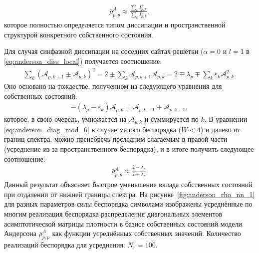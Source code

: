 \begin{equation}
	\label{eq:anderson_diag_mod_5}
	\begin{gathered}
		\bar{\rho}^A_{p,p} \approx \frac{\sum_k I^{+}_{p,k}}{ \sum_k I^{-}_{p,k}}, 
	\end{gathered}
\end{equation}
которое полностью определяется типом диссипации и пространственной структурой конкретного собственного состояния.

Для случая синфазной диссипации на соседних сайтах решётки (\(\alpha=0\) и \(l=1\) в \cref{eq:anderson_diss_local}) получается соотношение:
\begin{equation}
	\label{eq:anderson_diag_mod_6}
	\begin{gathered}
		\sum_k \left( \mathcal{A}_{p, k+1} \pm \mathcal{A}_{p, k} \right)^2 = 2 \pm \sum_k \mathcal{A}_{p, k+1} \mathcal{A}_{p, k} = 2 \mp \lambda_p \mp \sum_k \varepsilon_k \mathcal{A}^2_{p, k}.
	\end{gathered}
\end{equation}
Оно основано на тождестве, полученном из следующего уравнения для собственных состояний:
\begin{equation}
	\label{eq:anderson_diag_mod_7}
	\begin{gathered}
		-\left( \lambda_p - \varepsilon_k \right) \mathcal{A}_{p, k} = \mathcal{A}_{p, k-1} + \mathcal{A}_{p, k+1},
	\end{gathered}
\end{equation}
которое, в свою очередь, умножается на \(\mathcal{A}_{p, k}\) и суммируется по \(k\).
В уравнении \cref{eq:anderson_diag_mod_6} в случае малого беспорядка (\(W < 4\)) и далеко от границ спектра, можно пренебречь последним слагаемым в правой части (усреднение из-за пространственного беспорядка), и в итоге получить следующее соотношение:
\begin{equation}
	\label{eq:anderson_diag_mod_8}
	\begin{gathered}
		\bar{\rho}^A_{p,p} \approx \frac{2-\lambda_p}{2+\lambda_p}.
	\end{gathered}
\end{equation}
Данный результат объясняет быстрое уменьшение вклада собственных состояний при отдалении от нижней границы спектра.
На рисунке~\cref{fig:anderson_rho_nn_1} для разных параметров силы беспорядка символами изображены усреднённые по многим реализация беспорядка распределения диагональных элементов асимптотической матрицы плотности в базисе собственных состояний модели Андерсона \(\bar{\rho}^A_{p,p}\) как функции усреднённых собственных значений. Количество реализаций беспорядка для усреднения: \(N_r=100\).
